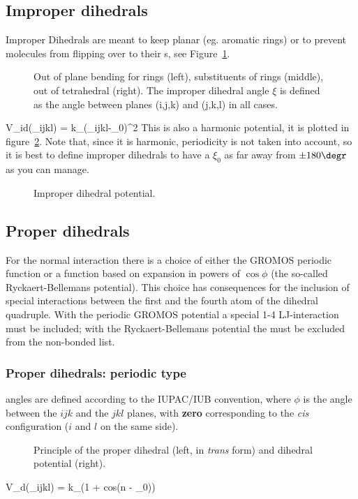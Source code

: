 \subsection{Improper dihedrals}
Improper Dihedrals are meant to keep  planar (eg. 
aromatic rings) or to prevent molecules from flipping over to their
s, see Figure~\ref{Fig:imp}.
\begin {figure}
\centerline{\hspace{1cm}
\hspace{1cm}}
\caption[Improper dihedral types.]{Out of plane bending for rings (left), substituents of rings (middle), out of tetrahedral (right). The improper dihedral angle $\xi$ is defined as the angle between planes (i,j,k) and (j,k,l) in all cases.}
\label{Fig:imp}
\end {figure}
\beq
V_{id}(\xi_{ijkl}) = k_{\xi}(\xi_{ijkl}-\xi_0)^2
\eeq
This is also a harmonic potential, it is plotted in
figure~\ref{fig:imps}. Note that, since it is harmonic, periodicity is
not taken into account, so it is best to define improper dihedrals
to have a $\xi_0$ as far away from $\pm 180 \degr$ as you can manage.

\begin {figure}
\centerline{}
\caption {Improper dihedral potential.}
\label{fig:imps}
\end {figure}

\subsection{Proper dihedrals}
For the normal  interaction there is a choice of either the
GROMOS periodic function or a function based on expansion in powers of
$\cos \phi$ (the so-called Ryckaert-Bellemans potential). This choice
has consequences for the inclusion of special interactions between the
first and the fourth atom of the dihedral quadruple. With the periodic
GROMOS potential a special 1-4 LJ-interaction must be included; with
the Ryckaert-Bellemans potential the  
must be excluded from the non-bonded list.  

\subsubsection{Proper dihedrals: periodic type}
 angles are defined according to the IUPAC/IUB
convention, where $\phi$ is the angle between the $ijk$ and the $jkl$
planes, with {\bf zero} corresponding to the {\em cis} configuration
($i$ and $l$ on the same side).
\begin {figure}
\centerline{}
\caption {Principle of the proper dihedral (left, in {\em trans} form)
and dihedral potential (right).} 
\label{fig:pdihf}
\end {figure}
\beq
V_d(\phi_{ijkl}) = k_{\phi}(1 + cos(n \phi - \phi_0))
\eeq

